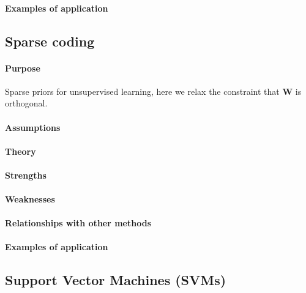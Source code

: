 \paragraph{Examples of application}



\subsection{Sparse coding}
\paragraph{Purpose}
Sparse priors for unsupervised learning, here we relax the constraint that $\bm{W}$
is orthogonal. 
\paragraph{Assumptions}
\paragraph{Theory}
\paragraph{Strengths}
\paragraph{Weaknesses}
\paragraph{Relationships with other methods}
\paragraph{Examples of application}

\subsection{Support Vector Machines (SVMs)}
